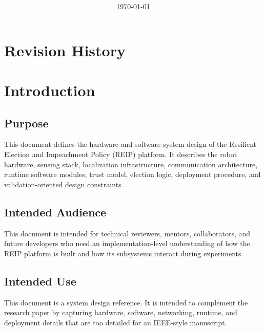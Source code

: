 \documentclass[a4paper,oneside,titlepage,11pt]{report}
\title{
    \vspace*{3cm}
    \textbf{\BoldTitle}\\[0.7cm]
    \Subtitle
}
\author{
    \Authors\\[2cm]
    \Institute\\
    \Course\\
    \Module\\
    \Docent\\
    \Assistant
}
\date{\vfill \today}
\begin{document}
\maketitle
\thispagestyle{empty}
\clearpage

\tableofcontents
\clearpage

\chapter*{Revision History}
\begin{versionhistory}
\end{versionhistory}
\clearpage


\chapter{Introduction}
\label{ch:intro}

\section{Purpose}
This document defines the hardware and software system design of the Resilient Election and Impeachment Policy (REIP) platform. It describes the robot hardware, sensing stack, localization infrastructure, communication architecture, runtime software modules, trust model, election logic, deployment procedure, and validation-oriented design constraints.

\section{Intended Audience}
This document is intended for technical reviewers, mentors, collaborators, and future developers who need an implementation-level understanding of how the REIP platform is built and how its subsystems interact during experiments.

\section{Intended Use}
This document is a system design reference. It is intended to complement the research paper by capturing hardware, software, networking, runtime, and deployment details that are too detailed for an IEEE-style manuscript.
\end{document}
